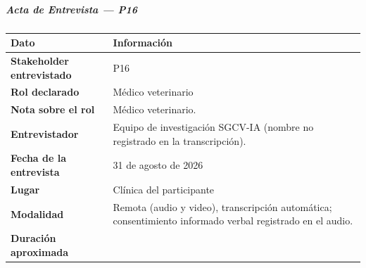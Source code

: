 \documentclass[
]{article}
\newcounter{none} %
\begin{document}
\subparagraph{Acta de Entrevista --- P16}\label{acta-entrevista-p16}

{\def\LTcaptype{none} %
\begin{longtable}[]{|
  >{\raggedright\arraybackslash}p{}|
  >{\raggedright\arraybackslash}p{}|}
\hline
\begin{minipage}[b]{\linewidth}\centering
\textbf{Dato}
\end{minipage} & \begin{minipage}[b]{\linewidth}\centering
\textbf{Información}
\end{minipage} \\
\hline
\endhead
\hline
\endlastfoot
\textbf{Stakeholder entrevistado} & \begin{minipage}[t]{\linewidth}\raggedright
P16
\end{minipage} \\
\hline
\textbf{Rol declarado} & \begin{minipage}[t]{\linewidth}\raggedright
Médico veterinario
\end{minipage} \\
\hline
\textbf{Nota sobre el rol} & \begin{minipage}[t]{\linewidth}\raggedright
Médico veterinario.
\end{minipage} \\
\hline
\textbf{Entrevistador} & \begin{minipage}[t]{\linewidth}\raggedright
Equipo de investigación SGCV-IA (nombre no registrado en la transcripción).
\end{minipage} \\
\hline
\textbf{Fecha de la entrevista} & \begin{minipage}[t]{\linewidth}\raggedright
31 de agosto de 2026
\end{minipage} \\
\hline
\textbf{Lugar} & \begin{minipage}[t]{\linewidth}\raggedright
Clínica del participante
\end{minipage} \\
\hline
\textbf{Modalidad} & \begin{minipage}[t]{\linewidth}\raggedright
Remota (audio y video), transcripción automática; consentimiento informado verbal registrado en el audio.
\end{minipage} \\
\hline
\textbf{Duración aproximada} & \begin{minipage}[t]{\linewidth}\raggedright

\end{minipage}
\end{longtable}}
\end{document}
